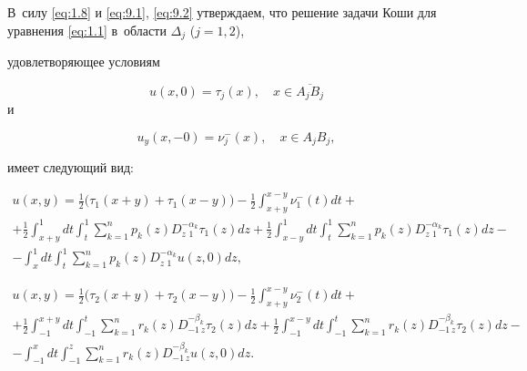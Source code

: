 \smallskip




В~силу  \eqref{eq:1.8} и \eqref{eq:9.1}, \eqref{eq:9.2} утверждаем, что решение задачи Коши для уравнения \eqref{eq:1.1} в~области ${\Delta _j}$ ($j = 1, 2$),

удовлетворяющее условиям   

$$

u(x, 0) = {\tau_j}(x),\quad  x\in \overline {{A_j}{B_j}} $$ и  

$${u_y}(x, - 0) = \nu _j^ - (x),\quad x \in {A_j}{B_j},$$  

имеет следующий вид:

 \begin{multline}

u(x,y) = \frac12 \bigl({{{\tau _1}(x + y) + {\tau _1}(x - y)}} \bigr) -

 \frac{1}{2} \int _{x + y}^{x - y} {\nu _1^ - (t)dt}  +

 \\ 

 +

  \frac{1}{2} \int _{x + y}^1

{dt \int _t^1 {\sum\limits_{k = 1}^n {{p_k}(z)D_{z\,\,1}^{ - {\alpha _k}}{\tau _1}(z)} dz} } +

 \frac{1}{2} \int _{x - y}^1 {dt \int _t^1 {\sum\limits_{k = 1}^n {{p_k}(z)D_{z\,\,1}^{- {\alpha _k}}{\tau _1}(z)}dz}} - 

 \\-  \int _x^1

 {dt \int _t^1 {\sum\limits_{k = 1}^n {{p_k}(z)D_{z\,\,1}^{ - {\alpha _k}}u(z, 0)} d} }z, \label{eq:11.1}

\end{multline}

\begin{multline}

u(x,y) = \frac12 \bigl({{{\tau _2}(x + y) + {\tau _2}(x - y)}}\bigr)  - \frac{1}{2} \int _{x + y}^{x - y} {\nu _2^ - (t)dt}  +

\\

+ \frac{1}{2} \int _{ - 1}^{x + y} {dt \int _{ - 1}^t {\sum\limits_{k = 1}^n {{r_k}(z)D_{ - 1\,z}^{ - {\beta _k}}{\tau _2}(z)} dz} }

+ \frac{1}{2} \int _{ - 1}^{x - y} {dt \int _{ - 1}^t {\sum\limits_{k = 1}^n {{r_k}(z)D_{ - 1\,z}^{ - {\beta _k}}{\tau _2}(z)} dz} }  - \\ -

  \int _{ - 1}^x {dt \int _{ - 1}^z {\sum\limits_{k = 1}^n {{r_k}(z)D_{ - 1\,z}^{ - {\beta _k}}u(z, 0)} d} } z.\label{eq:11.2}

\end{multline}


